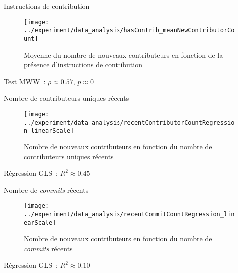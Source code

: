 \documentclass[usenames,dvipsnames,10pt]{beamer}
\begin{document}
\begin{frame}{Instructions de contribution}
    \begin{figure}
        \texttt{[image: ../experiment/data\_analysis/hasContrib\_meanNewContributorCount]}
        \caption{%
            Moyenne du nombre de nouveaux contributeurs en fonction de la
            présence d'instructions de contribution
        }
    \end{figure}

    Test MWW : $\rho \approx 0.57$, $p \approx 0$

\end{frame}

\begin{frame}{Nombre de contributeurs uniques récents}
    \begin{figure}
        \texttt{[image: ../experiment/data\_analysis/recentContributorCountRegression\_linearScale]}
        \caption{%
            Nombre de nouveaux contributeurs en fonction du nombre de
            contributeurs uniques récents
        }
    \end{figure}

    Régression GLS : $R^2 \approx 0.45$

\end{frame}

\begin{frame}{Nombre de \emph{commits} récents}
    \begin{figure}
        \texttt{[image: ../experiment/data\_analysis/recentCommitCountRegression\_linearScale]}
        \caption{%
            Nombre de nouveaux contributeurs en fonction du nombre de
            \emph{commits} récents
        }
    \end{figure}

    Régression GLS : $R^2 \approx 0.10$

\end{frame}
\end{document}
